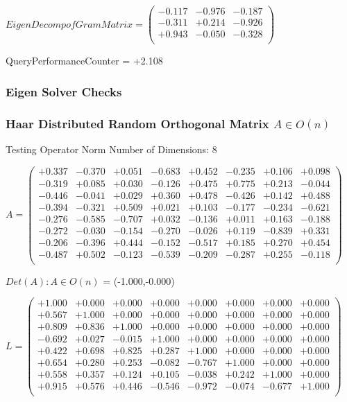 \documentclass[9pt]{article}
\theoremstyle{plain}
\theoremstyle{definition}
\theoremstyle{remark}
\numberwithin{equation}{section}
\begin{document}
$EigenDecomp of Gram Matrix = \left(
\begin{array}{
ccc}
-0.117 & -0.976 & -0.187 \\
-0.311 & +0.214 & -0.926 \\
+0.943 & -0.050 & -0.328 \\
\end{array}
\right)$ \newline 

QueryPerformanceCounter  =  +2.108
\subsubsection{Eigen Solver Checks}
\subsubsection{Haar Distributed Random Orthogonal Matrix $A \in O(n)$}
 Testing Operator Norm
Number of Dimensions: 8

$A = \left(
\begin{array}{
cccccccc}
+0.337 & -0.370 & +0.051 & -0.683 & +0.452 & -0.235 & +0.106 & +0.098 \\
-0.319 & +0.085 & +0.030 & -0.126 & +0.475 & +0.775 & +0.213 & -0.044 \\
-0.446 & -0.041 & +0.029 & +0.360 & +0.478 & -0.426 & +0.142 & +0.488 \\
-0.394 & -0.321 & +0.509 & +0.021 & +0.103 & -0.177 & -0.234 & -0.621 \\
-0.276 & -0.585 & -0.707 & +0.032 & -0.136 & +0.011 & +0.163 & -0.188 \\
-0.272 & -0.030 & -0.154 & -0.270 & -0.026 & +0.119 & -0.839 & +0.331 \\
-0.206 & -0.396 & +0.444 & -0.152 & -0.517 & +0.185 & +0.270 & +0.454 \\
-0.487 & +0.502 & -0.123 & -0.539 & -0.209 & -0.287 & +0.255 & -0.118 \\
\end{array}
\right)$ \newline 

$Det(A) :   A \in O(n)$ = (-1.000,-0.000)

$L = \left(
\begin{array}{
cccccccc}
+1.000 & +0.000 & +0.000 & +0.000 & +0.000 & +0.000 & +0.000 & +0.000 \\
+0.567 & +1.000 & +0.000 & +0.000 & +0.000 & +0.000 & +0.000 & +0.000 \\
+0.809 & +0.836 & +1.000 & +0.000 & +0.000 & +0.000 & +0.000 & +0.000 \\
-0.692 & +0.027 & -0.015 & +1.000 & +0.000 & +0.000 & +0.000 & +0.000 \\
+0.422 & +0.698 & +0.825 & +0.287 & +1.000 & +0.000 & +0.000 & +0.000 \\
+0.654 & +0.280 & +0.253 & -0.082 & -0.767 & +1.000 & +0.000 & +0.000 \\
+0.558 & +0.357 & +0.124 & +0.105 & -0.038 & +0.242 & +1.000 & +0.000 \\
+0.915 & +0.576 & +0.446 & -0.546 & -0.972 & -0.074 & -0.677 & +1.000 \\
\end{array}
\right)$ \newline 
\end{document}
